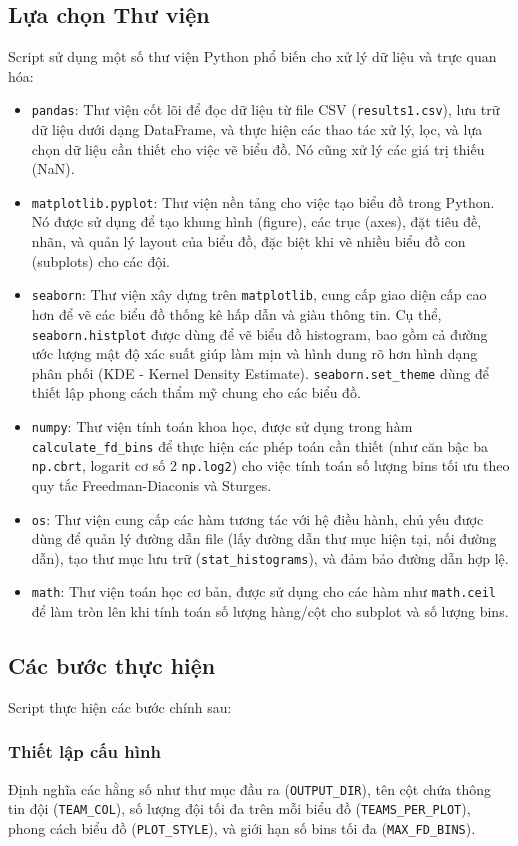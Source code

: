 \documentclass[12pt, a4paper]{report}
\begin{document}
\subsection{Lựa chọn Thư viện}
Script sử dụng một số thư viện Python phổ biến cho xử lý dữ liệu và trực quan hóa:
\begin{itemize}
    \item \texttt{pandas}: Thư viện cốt lõi để đọc dữ liệu từ file CSV (\texttt{results1.csv}), lưu trữ dữ liệu dưới dạng DataFrame, và thực hiện các thao tác xử lý, lọc, và lựa chọn dữ liệu cần thiết cho việc vẽ biểu đồ. Nó cũng xử lý các giá trị thiếu (NaN).
    \item \texttt{matplotlib.pyplot}: Thư viện nền tảng cho việc tạo biểu đồ trong Python. Nó được sử dụng để tạo khung hình (figure), các trục (axes), đặt tiêu đề, nhãn, và quản lý layout của biểu đồ, đặc biệt khi vẽ nhiều biểu đồ con (subplots) cho các đội.
    \item \texttt{seaborn}: Thư viện xây dựng trên \texttt{matplotlib}, cung cấp giao diện cấp cao hơn để vẽ các biểu đồ thống kê hấp dẫn và giàu thông tin. Cụ thể, \texttt{seaborn.histplot} được dùng để vẽ biểu đồ histogram, bao gồm cả đường ước lượng mật độ xác suất giúp làm mịn và hình dung rõ hơn hình dạng phân phối (KDE - Kernel Density Estimate). \texttt{seaborn.set\_theme} dùng để thiết lập phong cách thẩm mỹ chung cho các biểu đồ.
    \item \texttt{numpy}: Thư viện tính toán khoa học, được sử dụng trong hàm \texttt{calculate\_fd\_bins} để thực hiện các phép toán cần thiết (như căn bậc ba \texttt{np.cbrt}, logarit cơ số 2 \texttt{np.log2}) cho việc tính toán số lượng bins tối ưu theo quy tắc Freedman-Diaconis và Sturges.
    \item \texttt{os}: Thư viện cung cấp các hàm tương tác với hệ điều hành, chủ yếu được dùng để quản lý đường dẫn file (lấy đường dẫn thư mục hiện tại, nối đường dẫn), tạo thư mục lưu trữ (\texttt{stat\_histograms}), và đảm bảo đường dẫn hợp lệ.
    \item \texttt{math}: Thư viện toán học cơ bản, được sử dụng cho các hàm như \texttt{math.ceil} để làm tròn lên khi tính toán số lượng hàng/cột cho subplot và số lượng bins.
\end{itemize}

\subsection{Các bước thực hiện}
Script thực hiện các bước chính sau:
\subsubsection*{Thiết lập cấu hình}
Định nghĩa các hằng số như thư mục đầu ra (\texttt{OUTPUT\_DIR}), tên cột chứa thông tin đội (\texttt{TEAM\_COL}), số lượng đội tối đa trên mỗi biểu đồ (\texttt{TEAMS\_PER\_PLOT}), phong cách biểu đồ (\texttt{PLOT\_STYLE}), và giới hạn số bins tối đa (\texttt{MAX\_FD\_BINS}).
\end{document}

